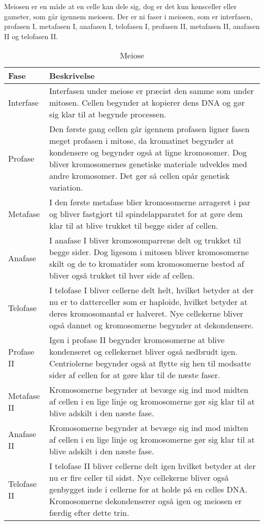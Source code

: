Meiosen er en måde at en celle kan dele sig, dog er det kun kønsceller eller gameter, som går igennem meiosen. Der er ni faser i meiosen, som er interfasen, profasen I, metafasen I, anafasen I, telofasen I, profasen II, metafasen II, anafasen II og telofasen II.
\begin{longtable}{ | m{3cm} | m{14cm} |}
    \caption{Meiose} \\
    \hline
    Fase & Beskrivelse \\ \hline
    
    Interfase & Interfasen under meiose er præcist den samme som under mitosen. Cellen begynder at kopierer dens DNA og  gør sig klar til at begynde processen. \\ \hline

    Profase & Den første gang cellen går igennem profasen ligner fasen meget profasen i mitose, da kromatinet begynder at kondensere og begynder også at ligne kromosomer. Dog bliver kromosomernes genetiske materiale udvekles med andre kromosomer. Det gør så cellen opår genetisk variation. \\ \hline

    Metafase &  I den første metafase blier kromosomerne arrageret i par og bliver fastgjort til spindelapparatet for at gøre dem klar til at blive trukket til begge sider af cellen. \\ \hline

    Anafase & I anafase I bliver kromosomparrene delt og trukket til begge sider. Dog ligesom i mitosen bliver kromosomerne skilt og de to kromatider som kromosomerne bestod af bliver også trukket til hver side af cellen. \\ \hline

    Telofase & I telofase I bliver cellerne delt helt, hvilket betyder at der nu er to datterceller som er haploide, hvilket betyder at deres kromosomantal er halveret. Nye cellekerne bliver også dannet og kromosomerne begynder at dekondensere. \\ \hline

   Profase II & Igen i profase II begynder kromosomerne at blive kondenseret og cellekernet bliver også nedbrudt igen. Centriolerne begynder også at flytte sig hen til modsatte sider af cellen for at gøre klar til de næste faser. \\ \hline
 
    Metafase II &  Kromosomerne begynder at bevæge sig ind mod midten af cellen i en lige linje og kromosomerne gør sig klar til at blive adskilt i den næste fase. \\ \hline

    Anafase II & Kromosomerne begynder at bevæge sig ind mod midten af cellen i en lige linje og kromosomerne gør sig klar til at blive adskilt i den næste fase. \\ \hline

    Telofase II & I telofase II bliver cellerne delt igen hvilket betyder at der nu er fire celler til sidst. Nye cellekerne bliver også genbygget inde i cellerne for at holde på en celles DNA. Kromosomerne dekondenserer også igen og meiosen er færdig efter dette trin. \\ \hline

\end{longtable}

